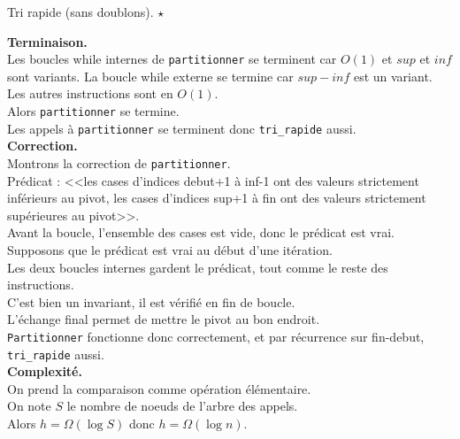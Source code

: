 \documentclass[french, 11pt]{article}
\begin{document}
\begin{defi}{Tri rapide (sans doublons). $\star$}{}
\begin{algorithm}[H]
    \end{algorithm}\noindent
    \begin{algorithm}[H]
        \caption{Tri rapide}
    \end{algorithm}\noindent
    \textbf{Terminaison.}\\
    Les boucles while internes de \texttt{partitionner} se terminent car $O(1)$ et $sup$ et $inf$ sont variants.
    La boucle while externe se termine car $sup - inf$ est un variant.
    Les autres instructions sont en $O(1)$.\\
    Alors \texttt{partitionner} se termine.\\
    Les appels à \texttt{partitionner} se terminent donc \texttt{tri\_rapide} aussi.\\
    \textbf{Correction.}\\
    Montrons la correction de \texttt{partitionner}.\\
    Prédicat : <<les cases d'indices debut+1 à inf-1 ont des valeurs strictement inférieurs au pivot, les cases d'indices sup+1 à fin ont des valeurs strictement supérieures au pivot>>.\\
    Avant la boucle, l'ensemble des cases est vide, donc le prédicat est vrai.\\
    Supposons que le prédicat est vrai au début d'une itération.\\
    Les deux boucles internes gardent le prédicat, tout comme le reste des instructions.\\
    C'est bien un invariant, il est vérifié en fin de boucle.\\
    L'échange final permet de mettre le pivot au bon endroit.\\
    \texttt{Partitionner} fonctionne donc correctement, et par récurrence sur fin-debut, \texttt{tri\_rapide} aussi.\\
    \textbf{Complexité.}\\
    On prend la comparaison comme opération élémentaire.\\
    On note $S$ le nombre de noeuds de l'arbre des appels.\\
    Alors $h=\Omega(\log S)$ donc $h=\Omega(\log n)$.\\

\end{defi}
\end{document}
